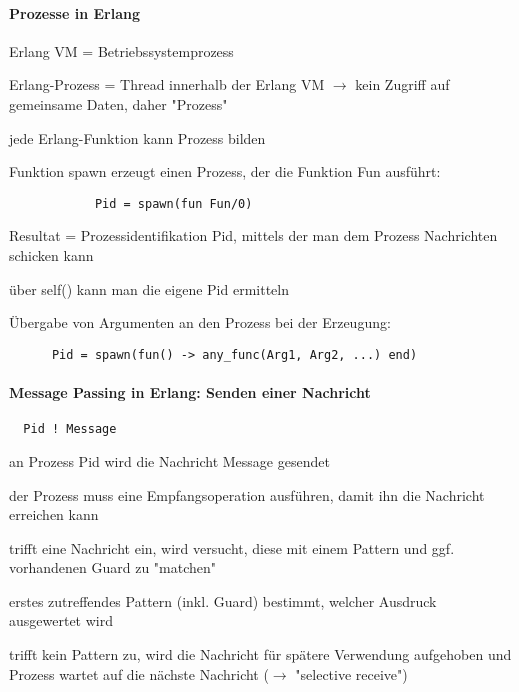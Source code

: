 \documentclass[10pt]{article}
\begin{document}
\begin{itemize*}
\paragraph{Prozesse in Erlang}
\begin{itemize*}
  \item Erlang VM = Betriebssystemprozess
  \item Erlang-Prozess = Thread innerhalb der Erlang VM $\rightarrow$ kein Zugriff auf gemeinsame Daten, daher "Prozess"
  \item jede Erlang-Funktion kann Prozess bilden
  \item Funktion spawn erzeugt einen Prozess, der die Funktion Fun ausführt:
  \begin{lstlisting}
            Pid = spawn(fun Fun/0)
          \end{lstlisting}
  \item Resultat = Prozessidentifikation Pid, mittels der man dem Prozess Nachrichten schicken kann
  \item über self() kann man die eigene Pid ermitteln
  \item Übergabe von Argumenten an den Prozess bei der Erzeugung:
  \begin{lstlisting}
      Pid = spawn(fun() -> any_func(Arg1, Arg2, ...) end)
    \end{lstlisting}
\end{itemize*}

\paragraph{Message Passing in Erlang: Senden einer Nachricht}
\begin{lstlisting}
  Pid ! Message
\end{lstlisting}
\begin{itemize*}
  \item an Prozess Pid wird die Nachricht Message gesendet
  \item der Prozess muss eine Empfangsoperation ausführen, damit ihn die Nachricht erreichen kann
  \item trifft eine Nachricht ein, wird versucht, diese mit einem Pattern und ggf. vorhandenen Guard zu "matchen"
  \item erstes zutreffendes Pattern (inkl. Guard) bestimmt, welcher Ausdruck ausgewertet wird
  \item trifft kein Pattern zu, wird die Nachricht für spätere Verwendung aufgehoben und Prozess wartet auf die nächste Nachricht ($\rightarrow$ "selective receive")
\end{itemize*}


\end{itemize*}
\end{document}
